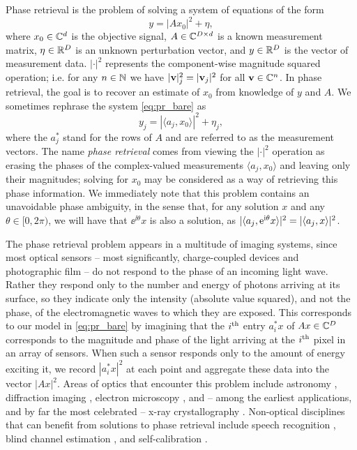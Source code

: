 Phase retrieval is the problem of solving a system of equations of the form \begin{equation} y = |A x_0|^2 + \eta, \label{eq:pr_bare} \end{equation} where $x_0 \in \mathbb{C}^d$ is the objective signal, $A \in \mathbb{C}^{D \times d}$ is a known measurement matrix, $\eta \in \mathbb{R}^D$ is an unknown perturbation vector, and $y \in \mathbb{R}^D$ is the vector of measurement data.  $|\cdot|^2$ represents the component-wise magnitude squared operation; i.e. for any $n \in \mathbb{N}$ we have $|\mathbf{v}|^2_j = |\mathbf{v}_j|^2$ for all $\mathbf{v} \in \mathbb{C}^n$.  In phase retrieval, the goal is to recover an estimate of $x_0$ from knowledge of $y$ and $A$.  We sometimes rephrase the system \eqref{eq:pr_bare} as \begin{equation} y_j = | \langle a_j, x_0 \rangle |^2 + \eta_j, \end{equation} where the $a_j^*$ stand for the rows of $A$ and are referred to as the measurement vectors.  The name \emph{phase retrieval} comes from viewing the $|\cdot|^2$ operation as erasing the phases of the complex-valued measurements $\langle a_j, x_0 \rangle$ and leaving only their magnitudes; solving for $x_0$ may be considered as a way of retrieving this phase information.  We immediately note that this problem contains an unavoidable phase ambiguity, in the sense that, for any solution $x$ and any $\theta \in [0, 2\pi)$, we will have that $\ee^{\ii \theta} x$ is also a solution, as $\lvert\langle a_j, \mathrm{e}^{\mathrm{i} \theta} x\rangle\rvert^2 = \lvert\langle a_j, x\rangle\rvert^2$.

  The phase retrieval problem appears in a multitude of imaging systems, since most optical sensors -- most significantly, charge-coupled devices and photographic film -- do not respond to the phase of an incoming light wave.  Rather they respond only to the number and energy of photons arriving at its surface, so they indicate only the intensity (absolute value squared), and not the phase, of the electromagnetic waves to which they are exposed.  This corresponds to our model in \eqref{eq:pr_bare} by imagining that the $i^{\text{th}}$ entry $a_i^* x$ of $Ax \in \mathbb{C}^D$ corresponds to the magnitude and phase of the light arriving at the $i^{\text{th}}$ pixel in an array of sensors.  When such a sensor responds only to the amount of energy exciting it, we record $|a_i^* x|^2$ at each point and aggregate these data into the vector $|A x|^2$.  Areas of optics that encounter this problem include astronomy \cite{fienup1987astronomy,walther1963question}, diffraction imaging \cite{millane1990phase,rodenburg2008diffractive,shechtman2015phase}, electron microscopy \cite{putkunz2012electron}, and -- among the earliest applications, and by far the most celebrated -- x-ray crystallography \cite{bragg1915crystal_structure,marchesini2015coptych,dierolf2008ptych,harrison1993phase,hauptman1953monograph,starodub2008damage}.  Non-optical disciplines that can benefit from solutions to phase retrieval include speech recognition \cite{balan2006signal, juang1993speechrec}, blind channel estimation \cite{strohmer2017wtf_deconv1, strohmer2017wtf_deconv2}, and self-calibration \cite{strohmer2015self_calib}.


